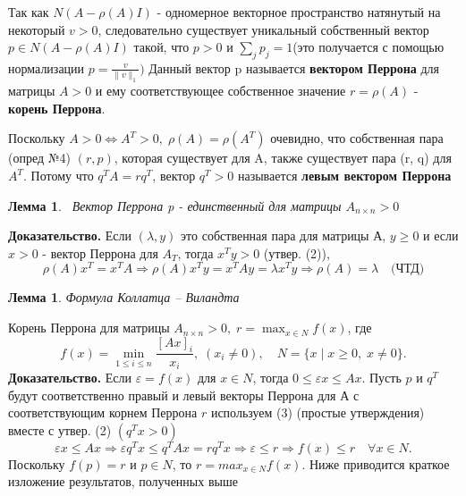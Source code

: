 \documentclass[a4paper,12pt,leqno]{article} %
\newtheorem{lemma}[theorem]{Лемма}
\begin{document}
    Так как $N(A - \rho(A)I)$ - одномерное векторное пространство натянутый на некоторый
    $v > 0$, следовательно существует уникальный собственный вектор $p \in N(A - \rho(A)I)$
    такой, что $p > 0$ и $\sum_j p_j = 1 $(это получается с помощью нормализации $p = \frac{v}{\|v\|_1})$
    Данный вектор p называется \textbf{вектором Перрона} для матрицы $A > 0$ и ему соответствующее
    собственное значение $r = \rho(A)$ - \textbf{корень Перрона}.
    
    Поскольку $A > 0 \Leftrightarrow A^T > 0, \; \rho(A) = \rho(A^T)$ очевидно, что собственная пара (опред №4)
    $(r, p)$, которая существует для A, также существует пара (r, q) для $A^T$.
    Потому что $q^T A = r q^T$, вектор $q^T > 0$ называется \textbf{левым вектором Перрона}
    \begin{lemma}
     Вектор Перрона p - единственный для матрицы  $A_{n \times n} > 0$
    \end{lemma} 
    
    \noindent    \textbf{Доказательство.} 
    Если $(\lambda, y)$ это собственная пара для матрицы А, \newline
    $y \geq 0$ и если $ x > 0$ - вектор Перрона для $A_T$, тогда $x^Ty > 0$ (утвер.
    (2)), 
    \begin{equation*}
        \rho(A)x^T = x^TA \Rightarrow \rho(A)x^Ty = x^TAy = \lambda x^T y \Rightarrow \rho(A) = \lambda \quad \text{(ЧТД)}
    \end{equation*}
    
    \begin{lemma}
        Формула Коллатца – Виландта
    \end{lemma}
    Корень Перрона для матрицы $A_{n \times n} > 0, \; r = \max_{x \in N} f(x)$, где
    \begin{equation*}
        f(x) = \min_{1 \leq i \leq n}\frac{[Ax]_{i}}{x_i}, \; (x_i \neq 0), \quad N = \{x\; |\; x \geq 0,\; x \neq 0\}.
    \end{equation*}
    \noindent\textbf{Доказательство.} Если $\varepsilon = f(x)$ 
    для $x \in N$, тогда $0 \leq \varepsilon x \leq Ax$. 
    Пусть $p$ и $q^T$ будут соответственно правый и левый векторы Перрона для А с соответствующим
    корнем Перрона $r$ используем (3) (простые утверждения) вместе с утвер. (2) $(q^Tx > 0)$
    \begin{equation*}
        \varepsilon x \leq Ax \Rightarrow \varepsilon q^Tx \leq q^TAx = rq^Tx \Rightarrow
        \varepsilon \leq r \Rightarrow f(x) \leq r \quad \forall x \in N. 
    \end{equation*}
    Поскольку $f(p) = r$ и $ p \in N$, то $r = max_{x \in N}f(x).$ \newline
    Ниже приводится краткое изложение результатов, полученных выше
\end{document}
